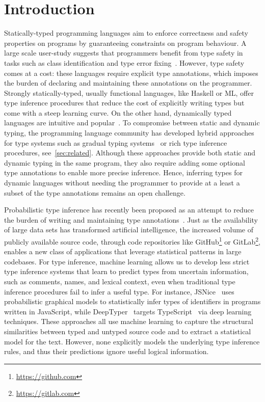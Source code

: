 \documentclass[sigplan,10pt,review,anonymous]{acmart} %
\theoremstyle{plain}
\theoremstyle{remark}
\theoremstyle{definition}
\begin{document}
\section{Introduction}
Statically-typed programming languages aim to enforce correctness and safety  properties
on programs by guaranteeing constraints on program behaviour.
A large scale user-study
suggests that programmers
benefit from type safety in tasks
such as class identification and type error fixing~\citep{hanenberg14, gao17}.
However, type safety comes at a cost: these languages require explicit type annotations,
which imposes the burden of declaring and maintaining these annotations on the programmer.
Strongly statically-typed, usually functional languages, like Haskell or ML,
offer type inference procedures that reduce
the cost of explicitly writing types but come with
a steep learning curve.
On the other hand, dynamically typed languages are intuitive
and popular~\cite{meyerovich12}.
To compromise between static and dynamic typing,
the programming language community has developed hybrid approaches for type systems
such as gradual typing systems~\cite{siek06} or rich type inference procedures, see~\cref{sec:related}.
Although these approaches provide both static and dynamic typing in the same program,
they also require adding some optional type annotations to enable more precise inference.
Hence, inferring types for dynamic
languages without needing the programmer to provide at a least a subset of
the type annotations remains an open challenge.

Probabilistic type inference
has recently been proposed as an attempt to reduce the burden
of writing and maintaining type
annotations~\cite{raychev15,xu16,hellendoorn18}.
Just as the availability of large data sets has transformed artificial intelligence,
the increased volume of publicly available source code, through
code repositories like GitHub\footnote{\href{https://github.com}{https://github.com}}
or GitLab\footnote{\href{https://gitlab.com}{https://gitlab.com}},
enables a new class of applications that leverage statistical
patterns in large codebases.
For type inference, machine learning
allows us to develop less strict type inference systems
that learn to predict types from uncertain information,
such as comments, names, and lexical context,
even when traditional type inference procedures
fail to infer a useful type.
For instance,
JSNice~\cite{raychev15} uses probabilistic graphical models to statistically infer types of identifiers
in programs written in JavaScript,
while DeepTyper~\cite{hellendoorn18} targets TypeScript~\cite{typescript} via deep learning techniques.
These approaches all use machine learning to capture the structural
similarities between typed and untyped source code and to extract a statistical model for
the text. However, none explicitly models the underlying
type inference rules, and thus their predictions ignore useful logical information.
\end{document}
